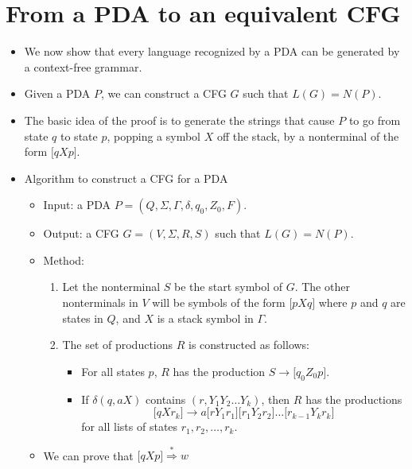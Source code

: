 \documentclass[]{article}
\begin{document}
\section*{From a PDA to an equivalent CFG}
  \begin{itemize}
    \item We now show that every language recognized by a PDA can be generated 
    by a context-free grammar.
    \item Given a PDA $P$, we can construct a CFG $G$ such that $L(G) = N(P)$.
    \item The basic idea of the proof is to generate the strings that cause $P$ 
    to go from state $q$ to state $p$, popping a symbol $X$ off the stack, by a 
    nonterminal of the form $\lbrack qXp \rbrack$.
    \item Algorithm to construct a CFG for a PDA
      \begin{itemize}
        \item Input: a PDA $P = (Q,\Sigma,\Gamma,\delta,q_0,Z_0,F)$.
        \item Output: a CFG $G = (V,\Sigma,R,S)$ such that $L(G) = N(P)$.
        \item Method:
          \begin{enumerate}
            \item Let the nonterminal $S$ be the start symbol of $G$. The other 
            nonterminals in $V$ will be symbols of the form $\lbrack pXq \rbrack
            $ where $p$ and $q$ are states in $Q$, and $X$ is a stack symbol in 
            $\Gamma$.
            \item The set of productions $R$ is constructed as follows:
              \begin{itemize}
                \item For all states $p$, $R$ has the production $S \rightarrow 
                \lbrack q_0Z_0p\rbrack$.
                \item If $\delta(q,aX)$ contains $(r,Y_1Y_2\ldots{}Y_k)$, then 
                $R$ has the productions
                  \[ 
                    \lbrack qXr_k \rbrack \rightarrow a \lbrack rY_1r_1 \rbrack
                    \lbrack r_1Y_2r_2 \rbrack \ldots \lbrack r_{k-1}Y_kr_k 
                    \rbrack
                  \]
                for all lists of states $r_1, r_2, \ldots, r_k$.
              \end{itemize}
          \end{enumerate}
        \item We can prove that $\lbrack qXp \rbrack \overset{*}{\Rightarrow} w$ 

\end{itemize}
\end{itemize}
\end{document}
